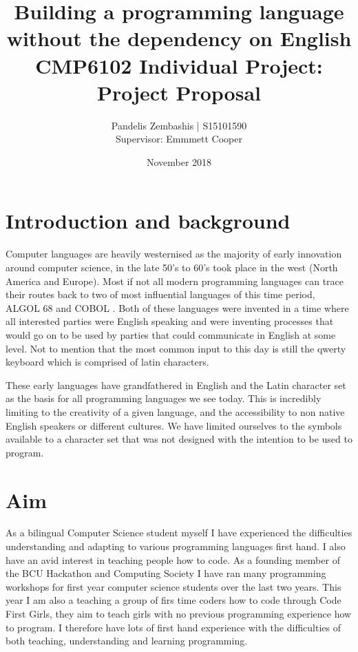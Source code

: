 \documentclass[12pt]{article}
\title{%
  Building a programming language without the dependency on English \\
  \large CMP6102 Individual Project:
 Project Proposal }
\author{Pandelis Zembashis | S15101590 \\ 
Supervisor: Emmmett Cooper}
\date{November 2018}
\begin{document}
\maketitle

\clearpage


\section{Introduction and background}

Computer languages are heavily westernised as the majority of 
early innovation around computer science, in the late 50's to 60's 
took place in the west (North America and Europe). Most if not all
modern programming languages can trace their routes back to two of
most influential languages of this time period, ALGOL 68 and COBOL 
\parencite{5396281}. Both of these languages were invented in a time
where all interested parties were English speaking and were inventing
processes that would go on to be used by parties that could communicate
in English at some level. Not to mention that the most common input to this
day is still the qwerty keyboard which is comprised of latin characters.

These early languages have grandfathered in English and the Latin 
character set as the basis for all programming languages we see today. 
This is incredibly limiting to the creativity of a given language,
and the accessibility to non native English speakers or different cultures. 
We have limited ourselves to the symbols available to a character set that was not designed with the intention
to be used to program.

\section{Aim}

As a bilingual Computer Science student myself I have experienced the difficulties understanding and adapting to various programming
languages first hand. I also have an avid interest in teaching people how to code. As a founding member of the BCU Hackathon and Computing Society \parencite{noauthor_hacs_nodate}
I have ran many programming workshops for first year computer science students over the last two years. This year I am also a teaching a group of firs time coders
how to code through Code First Girls\parencite{noauthor_code_nodate},
they aim to teach girls with no previous programming experience how to program. I therefore have lots of first hand experience with the
difficulties of both teaching, understanding and learning programming.
\end{document}
